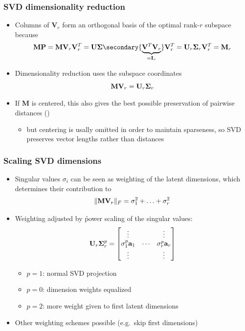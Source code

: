\documentclass[t]{beamer} %
\begin{document}
\begin{frame}
  \frametitle{SVD dimensionality reduction}

  \begin{itemize}
  \item Columns of $\mathbf{V}_r$ form an orthogonal basis of the optimal rank-$r$ subspace because
    \[
      \mathbf{M} \mathbf{P} = \mathbf{M} \mathbf{V}_r \mathbf{V}_r^T
      = \mathbf{U} \Msigma \secondary{\underbrace{\mathbf{V}^T \mathbf{V}_r}_{= \mathbf{I}_r}} \mathbf{V}_r^T
      = \mathbf{U}_r \Msigma_r \mathbf{V}_r^T = \mathbf{M}_r
    \]
  \item<2-> \h{Dimensionality reduction} uses the subspace coordinates
    \[
      \mathbf{M} \mathbf{V}_r = \mathbf{U}_r \Msigma_r
    \]
  \item<3-> If $\mathbf{M}$ is centered, this also gives the best possible
    preservation of pairwise distances \so {}
    ()
    \begin{itemize}
    \item[\hand] but centering is usally omitted in order to maintain sparseness,
      so SVD preserves vector lengths rather than distances
    \end{itemize}
  \end{itemize}
\end{frame}

\begin{frame}
  \frametitle{Scaling SVD dimensions}

  \begin{itemize}
  \item Singular values $\sigma_i$ can be seen as weighting of the latent
    dimensions, which determines their contribution to
    \[
      \norm[F]{\mathbf{M} \mathbf{V}_r} = \sigma_1^2 + \ldots + \sigma_r^2
    \]
  \item<2-> Weighting adjusted by \h{power scaling} of the singular values:
    \[
      \mathbf{U}_r \Msigma_r^p
      = \begin{bmatrix}
        \vdots &  & \vdots \\
        \sigma_1^p \va_1 & \cdots & \sigma_r^p \va_r \\
        \vdots &  & \vdots 
      \end{bmatrix}
    \]
    \ungap[1]
    \begin{itemize}
    \item $p = 1$: normal SVD projection
    \item $p = 0$: dimension weights equalized
    \item $p = 2$: more weight given to first latent dimensions
    \end{itemize}
  \item<2-> Other weighting schemes possible (e.g.\ skip first dimensions)
  \end{itemize}
\end{frame}
\end{document}
